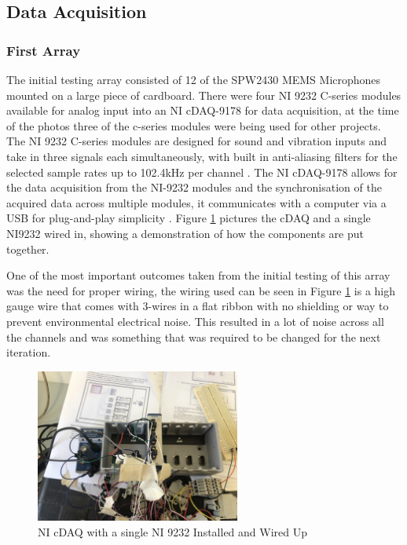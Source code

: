 \documentclass{UoNMCHA}
\numberwithin{equation}{section}
\begin{document}
\subsection{Data Acquisition} \label{sec:DAQ}

\subsubsection{First Array} \label{sec:First Design DAQ}
    The initial testing array consisted of 12 of the SPW2430 MEMS Microphones mounted on a large piece of cardboard. There were four NI 9232 C-series modules available for analog input into an NI cDAQ-9178 for data acquisition, at the time of the photos three of the c-series modules were being used for other projects. The NI 9232 C-series modules are designed for sound and vibration inputs and take in three signals each simultaneously, with built in anti-aliasing filters for the selected sample rates up to 102.4kHz per channel \citep{NI9232}. The NI cDAQ-9178 allows for the data acquisition from the NI-9232 modules and the synchronisation of the acquired data across multiple modules, it communicates with a computer via a USB for plug-and-play simplicity \citep{cDAQ9178}. Figure \ref{fig:TestSetup} pictures the cDAQ and a single NI9232 wired in, showing a demonstration of how the components are put together.

    One of the most important outcomes taken from the initial testing of this array was the need for proper wiring, the wiring used can be seen in Figure \ref{fig:TestSetup} is a high gauge wire that comes with 3-wires in a flat ribbon with no shielding or way to prevent environmental electrical noise. This resulted in a lot of noise across all the channels and was something that was required to be changed for the next iteration.

    \begin{figure} [H]
        \centering
        \includegraphics[keepaspectratio, width = 0.6\textwidth]{Figures/cDAQ.jpg}
        \caption{NI cDAQ with a single NI 9232 Installed and Wired Up}
        \label{fig:TestSetup}
    \end{figure}
\end{document}
